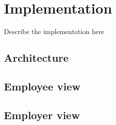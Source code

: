 \chapter{Implementation}\label{ch:implementation} %
Describe the implementation here

\section{Architecture}

\section{Employee view}

\section{Employer view}

